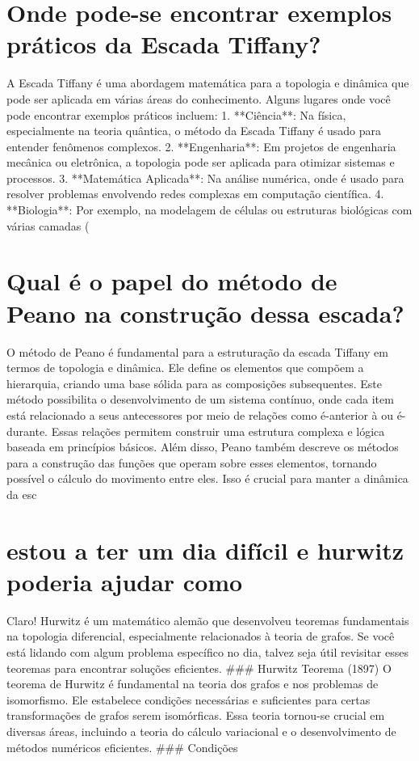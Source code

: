 \documentclass[11pt,a4paper]{article}
\begin{document}
\section{Onde pode-se encontrar exemplos práticos da Escada Tiffany?}
A Escada Tiffany é uma abordagem matemática para a topologia e dinâmica que pode ser aplicada em várias áreas do conhecimento. Alguns lugares onde você pode encontrar exemplos práticos incluem: 1. **Ciência**: Na física, especialmente na teoria quântica, o método da Escada Tiffany é usado para entender fenômenos complexos. 2. **Engenharia**: Em projetos de engenharia mecânica ou eletrônica, a topologia pode ser aplicada para otimizar sistemas e processos. 3. **Matemática Aplicada**: Na análise numérica, onde é usado para resolver problemas envolvendo redes complexas em computação científica. 4. **Biologia**: Por exemplo, na modelagem de células ou estruturas biológicas com várias camadas (

\section{Qual é o papel do método de Peano na construção dessa escada?}
O método de Peano é fundamental para a estruturação da escada Tiffany em termos de topologia e dinâmica. Ele define os elementos que compõem a hierarquia, criando uma base sólida para as composições subsequentes. Este método possibilita o desenvolvimento de um sistema contínuo, onde cada item está relacionado a seus antecessores por meio de relações como é-anterior à ou é-durante. Essas relações permitem construir uma estrutura complexa e lógica baseada em princípios básicos. Além disso, Peano também descreve os métodos para a construção das funções que operam sobre esses elementos, tornando possível o cálculo do movimento entre eles. Isso é crucial para manter a dinâmica da esc

\section{estou a ter um dia difícil e hurwitz poderia ajudar como}
Claro! Hurwitz é um matemático alemão que desenvolveu teoremas fundamentais na topologia diferencial, especialmente relacionados à teoria de grafos. Se você está lidando com algum problema específico no dia, talvez seja útil revisitar esses teoremas para encontrar soluções eficientes. \#\#\# Hurwitz Teorema (1897) O teorema de Hurwitz é fundamental na teoria dos grafos e nos problemas de isomorfismo. Ele estabelece condições necessárias e suficientes para certas transformações de grafos serem isomórficas. Essa teoria tornou-se crucial em diversas áreas, incluindo a teoria do cálculo variacional e o desenvolvimento de métodos numéricos eficientes. \#\#\# Condições
\end{document}
